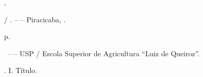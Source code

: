 \documentclass[book,A4paper,10pt,twoside,oldfontcommands]{memoir}\usepackage[]{graphicx}\usepackage[usenames,dvipsnames]{color}
\begin{document}
\begin{center}
\vspace{30pt}
  \begin{minipage}{0.60\textwidth}
    {\fontsize{8}{8} \sffamily
      \Sobrenome, \Nome

      \hspace{.5cm} / \Nome \Sobrenome. \Revis -- -- Piracicaba,
      .

      \vspace{-.175cm}
      \hspace{.5cm} p.}
  \end{minipage}
\end{center}

\begin{center}
\begin{SingleSpace}
  \begin{minipage}{0.60\textwidth}
    {\fontsize{8}{8} \sffamily
      \hspace{.5cm}\TipoTrabalho \, -- -- USP / Escola Superior de Agricultura ``Luiz de Queiroz''. \CENA}
  \end{minipage}
\end{SingleSpace}
\end{center}

\begin{center}
\begin{SingleSpace}
  \begin{minipage}{0.60\textwidth}
    {\fontsize{8}{8} \sffamily
      \hspace{.5cm}\PalavrasChaveFicha. I. Título.}
  \end{minipage}
\end{SingleSpace}
\end{center}


\newpage

\openany
\rmfamily

\end{document}
